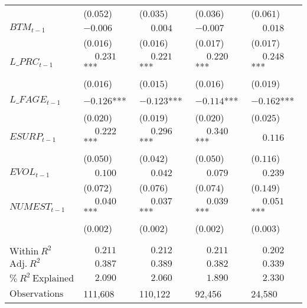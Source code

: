 \begin{table}
\begin{tabular}[t]{>{\raggedright\arraybackslash}p{3.1cm}>{\raggedright\arraybackslash}p{2.6cm}>{\raggedright\arraybackslash}p{2.6cm}>{\raggedright\arraybackslash}p{2.6cm}>{\raggedright\arraybackslash}p{2.6cm}}
 & (\phantom{-}$0.052$) & (\phantom{-}$0.035$) & (\phantom{-}$0.036$) & (\phantom{-}$0.061$)\\
\addlinespace
$BTM_{t-1}$ & $-0.006$ & $\phantom{-}0.004$ & $-0.007$ & $\phantom{-}0.018$\\
 & (\phantom{-}$0.016$) & (\phantom{-}$0.016$) & (\phantom{-}$0.017$) & (\phantom{-}$0.017$)\\
\addlinespace
$L\_PRC_{t-1}$ & $\phantom{-}0.231$*** & $\phantom{-}0.221$*** & $\phantom{-}0.220$*** & $\phantom{-}0.248$***\\
 & (\phantom{-}$0.016$) & (\phantom{-}$0.015$) & (\phantom{-}$0.016$) & (\phantom{-}$0.019$)\\
\addlinespace
$L\_FAGE_{t-1}$ & $-0.126$*** & $-0.123$*** & $-0.114$*** & $-0.162$***\\
 & (\phantom{-}$0.020$) & (\phantom{-}$0.019$) & (\phantom{-}$0.020$) & (\phantom{-}$0.025$)\\
\addlinespace
$ESURP_{t-1}$ & $\phantom{-}0.222$*** & $\phantom{-}0.296$*** & $\phantom{-}0.340$*** & $\phantom{-}0.116$\\
 & (\phantom{-}$0.050$) & (\phantom{-}$0.042$) & (\phantom{-}$0.050$) & (\phantom{-}$0.116$)\\
\addlinespace
$EVOL_{t-1}$ & $\phantom{-}0.100$ & $\phantom{-}0.042$ & $\phantom{-}0.079$ & $\phantom{-}0.239$\\
 & (\phantom{-}$0.072$) & (\phantom{-}$0.076$) & (\phantom{-}$0.074$) & (\phantom{-}$0.149$)\\
\addlinespace
$NUMEST_{t-1}$ & $\phantom{-}0.040$*** & $\phantom{-}0.037$*** & $\phantom{-}0.039$*** & $\phantom{-}0.051$***\\
 & (\phantom{-}$0.002$) & (\phantom{-}$0.002$) & (\phantom{-}$0.002$) & (\phantom{-}$0.003$)\\
 &  &  &  \vphantom{1} & \\
\midrule
 &  &  &  & \\
$\textrm{Within} \: R^2$ & {$\phantom{-}0.211$} & {$\phantom{-}0.212$} & {$\phantom{-}0.211$} & {$\phantom{-}0.202$}\\
$\textrm{Adj.} \: R^2$ & {$\phantom{-}0.387$} & {$\phantom{-}0.389$} & {$\phantom{-}0.382$} & {$\phantom{-}0.339$}\\
$\% \: R^2 \: \textrm{Explained}$ & {$\phantom{-}2.090$} & {$\phantom{-}2.060$} & {$\phantom{-}1.890$} & {$\phantom{-}2.330$}\\
$\textrm{Observations}$ & {\phantom{-}111,608} & {\phantom{-}110,122} & {\phantom{-}92,456} & {\phantom{-}24,580}\\
\bottomrule
\end{tabular}
\end{table}